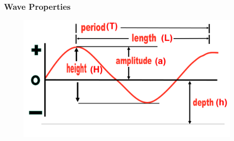 \documentclass[7pt]{beamer}
\begin{document}


\begin{frame}
\frametitle{Wave Properties}
\begin{figure}[flowchart]
\includegraphics[width=1.0\linewidth]{img/Wave.jpg}\hfill
\end{figure}

\end{frame}
\end{document}

